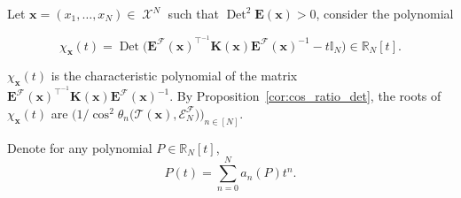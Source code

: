 \documentclass[twoside,11pt]{book}
\numberwithin{theorem}{chapter}
\numberwithin{definition}{chapter}
\numberwithin{proposition}{chapter}
\numberwithin{corollary}{chapter}
\numberwithin{example}{chapter}
\numberwithin{lemma}{chapter}
\numberwithin{assumption}{chapter}
\numberwithin{equation}{chapter}
\numberwithin{figure}{chapter}
\DeclareMathOperator{\Tr}{Tr}
\DeclareMathOperator{\Det}{Det}
\DeclareMathOperator{\Tran}{\intercal}
\DeclareMathOperator{\X}{\mathcal{X}}
\begin{document}
Let $\bm{x} = (x_{1}, \dots, x_{N}) \in \X^{N}$ such that $\Det^{2} \bm{E}(\bm{x}) > 0$, consider the polynomial 

\begin{equation}
\chi_{\bm{x}}(t) = \Det \Big( \bm{E}^{\mathcal{F}}(\bm{x})^{\Tran^{-1}}\bm{K}(\bm{x})\bm{E}^{\mathcal{F}}(\bm{x})^{-1}  - t \mathbb{I}_{N} \Big) \in \mathbb{R}_{N}[t].
\end{equation}


$\chi_{\bm{x}}(t)$ is the characteristic polynomial of the matrix $\bm{E}^{\mathcal{F}}(\bm{x})^{\Tran^{-1}}\bm{K}(\bm{x})\bm{E}^{\mathcal{F}}(\bm{x})^{-1}$. By Proposition~\ref{cor:cos_ratio_det}, the roots of $\chi_{\bm{x}}(t)$ are  $\Big(1/\cos^{2} \theta_{n}\big(\mathcal{T}(\bm{x}), \mathcal{E}_{N}^{\mathcal{F}} \big) \Big)_{n \in [N]}$.

Denote for any polynomial $P \in \mathbb{R}_{N}[t]$,
\begin{equation}
P(t) = \sum\limits_{n = 0}^{N} a_{n}(P)t^{n}.
\end{equation}
\end{document}

